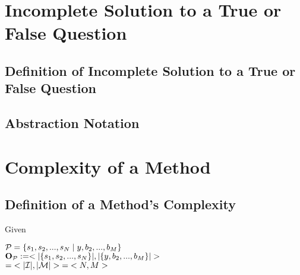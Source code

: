 \documentclass[11pt]{article}
\begin{document}
\section*{Incomplete Solution to a True or False Question}
\subsection{Definition of Incomplete Solution to a True or False Question}
\subsection{Abstraction Notation}











\newpage

\section{Complexity of a Method}

\subsection{Definition of a Method's Complexity}
Given
\begin{center}
$
\mathcal{P} =\{ s_1,s_2,...,s_{N}\hspace{1mm}|\hspace{1mm} y, b_2,...,b_M\} 
$
\\ \vspace{6mm}
$
\bold{O}_{\mathcal{P}} := <|\{s_1,s_2,...,s_{N}\}|,|\{y, b_2,...,b_M\}|>
$
\\ \vspace{2mm}
$
= \hspace{1mm}<|\mathcal{I}|,|\mathcal{M}|>\hspace{1mm} = \hspace{1mm} <N,M>
$
\end{center}
\end{document}
